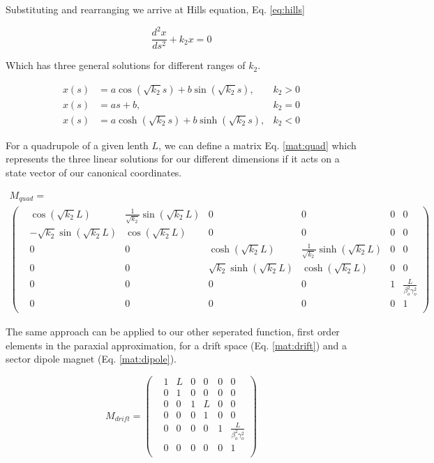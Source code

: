 Substituting and rearranging we arrive at Hills equation, Eq. \ref{eq:hills}

\begin{equation} \label{eq:hills}
	\frac{d^2 x}{ds^2} + k_2 x = 0
\end{equation}

Which has three general solutions for different ranges of $k_2$.

\begin{align} \label{eq:hillSol}
	x(s) &= a \cos{\left(\sqrt{k_2} s\right)} + b \sin{\left(\sqrt{k_2} s\right)}, &k_2>0\\
	x(s) &= a s + b, &k_2 =0 \\
	x(s) &= a \cosh{\left(\sqrt{k_2} s\right)} + b \sinh{\left(\sqrt{k_2} s\right)}, &k_2<0
\end{align}

For a quadrupole of a given lenth $L$, we can define a matrix Eq. \ref{mat:quad} which represents the three linear solutions for our different dimensions if it acts on a state vector of our canonical coordinates.

\begin{multline} \label{mat:quad}
	M_{quad} = \\
\begin{pmatrix} 
	&\cos{\left(\sqrt{k_2} L\right)} &\frac{1}{\sqrt{k_2}}\sin{\left(\sqrt{k_2} L\right)} &0 &0 &0 &0\\
	&-\sqrt{k_2}\sin{\left(\sqrt{k_2} L\right)} &\cos{\left(\sqrt{k_2} L\right)} &0 &0 &0 &0\\
	&0 &0 &\cosh{\left(\sqrt{k_2} L\right)} &\frac{1}{\sqrt{k_2}}\sinh{\left(\sqrt{k_2} L\right)} &0 &0\\
	&0 &0 &\sqrt{k_2}\sinh{\left(\sqrt{k_2} L\right)} &\cosh{\left(\sqrt{k_2} L\right)} &0 &0\\
	&0 &0 &0 &0 &1 &\frac{L}{\beta_o^2\gamma_o^2}\\
	&0 &0 &0 &0 &0 &1\\
\end{pmatrix}
\end{multline}

The same approach can be applied to our other seperated function, first order elements in the paraxial approximation, for a drift space (Eq. \ref{mat:drift}) and a sector dipole magnet (Eq. \ref{mat:dipole}).

\begin{equation} \label{mat:drift}
	M_{drift} =
\begin{pmatrix}
	&1 &L &0 &0 &0 &0\\
	&0 &1 &0 &0 &0 &0\\
	&0 &0 &1 &L &0 &0\\
	&0 &0 &0 &1 &0 &0\\
	&0 &0 &0 &0 &1 &\frac{L}{\beta_o^2\gamma_o^2}\\
	&0 &0 &0 &0 &0 &1\\
\end{pmatrix}
\end{equation}

